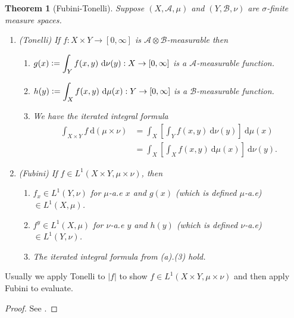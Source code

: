 \documentclass{report}
\newcommand{\cA}{\mathcal{A}}
\newcommand{\cB}{\mathcal{B}}
\newcommand{\df}{\ \mathrm{d}}
\newcommand{\defeq}{\vcentcolon=}
\newtheorem{theorem}{Theorem}[chapter]
\theoremstyle{definition}
\theoremstyle{remark}
\begin{document}
\begin{theorem}[Fubini-Tonelli] Suppose $(X, \cA, \mu)$ and $(Y, \cB, \nu)$ are $\sigma$-finite measure spaces. \begin{enumerate}
	\item (Tonelli) If $f: X \times Y \to [0, \infty]$ is $\cA \otimes \cB$-measurable then \begin{enumerate}
		\item $\displaystyle g(x) \defeq \int_Y f(x, y)\df \nu(y): X \to [0, \infty]$ is a $\cA$-measurable function.
		\item $\displaystyle h(y) \defeq \int_X f(x, y)\df \mu(x): Y \to [0, \infty]$ is a $\cB$-measurable function.
		\item We have the iterated integral formula \begin{align*}
			\int_{X \times Y} f \df (\mu \times \nu) 
			& = \int_X \left[\int_Y f(x, y) \df \nu(y)\right] \df \mu(x) \\
			& = \int_X \left[\int_X f(x, y) \df \mu(x)\right] \df \nu(y).
		\end{align*}
	\end{enumerate}
	\item (Fubini) If $f \in L^1(X \times Y, \mu \times \nu)$, then 
	\begin{enumerate}
		\item $f_x \in L^1(Y, \nu)$ for $\mu$-a.e $x$ and $g(x)$ (which is defined $\mu$-a.e) $\in L^1(X, \mu)$.
		\item $f^y \in L^1(X, \mu)$ for $\nu$-a.e $y$ and $h(y)$ (which is defined $\nu$-a.e) $\in L^1(Y, \nu)$.
		\item The iterated integral formula from (a).(3) hold.
	\end{enumerate}
\end{enumerate}
\end{theorem}

Usually we apply Tonelli to $|f|$ to show $f \in L^1(X \times Y, \mu \times \nu)$ and then apply Fubini to evaluate.

\begin{proof}
	See \cite{follandRealAnalysisModern1999}.
\end{proof}
\end{document}
